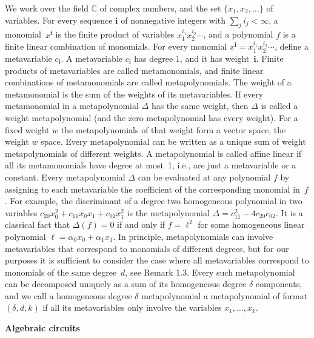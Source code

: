 We work over the field $\mathbb{C}$ of complex numbers, and the set $\{x_{1},x_{2},\ldots\}$ of variables.
For every sequence $\bm{i}$ of nonnegative integers with $\sum_{j}i_{j}<\infty$,
a monomial $x^{\bm{i}}$ is the finite product of variables $x_{1}^{i_{1}}x_{2}^{i_{2}}\cdots$, and a polynomial $f$ is a finite linear combination of monomials.
For every monomial $x^{\bm{i}}=x_{1}^{i_{1}}x_{2}^{i_{2}}\cdots$, define a metavariable $c_{\bm{i}}$.
A metavariable $c_{{\bm{i}}}$ has degree 1, and it has weight $\bm{i}$.
Finite products of metavariables are called metamonomials, and finite linear combinations of metamonomials are called metapolynomials.
The weight of a metamonomial is the sum of the weights of its metavariables.
If every metamonomial in a metapolynomial $\Delta$ has the same weight, then $\Delta$ is called a weight metapolynomial (and the zero metapolynomial has every weight).
For a fixed weight $w$ the metapolynomials of that weight form a vector space, the weight $w$ space.
Every metapolynomial can be written as a unique sum of weight metapolynomials of different weights.
A metapolynomial is called affine linear if all its metamonomials have degree at most 1, i.e., are just a metavariable or a constant.
Every metapolynomial $\Delta$ can be evaluated at any polynomial $f$ by assigning to each metavariable the coefficient of the corresponding monomial in $f$.
For example, the discriminant of a degree two homogeneous polynomial in two variables $c_{20}x_{0}^{2}+c_{11}x_{0}x_{1}+c_{02}x_{1}^{2}$ is the metapolynomial $\Delta=c_{11}^{2}-4c_{20}c_{02}$. It is a classical fact that $\Delta(f)=0$ if and only if $f=\ell^{2}$ for some homogeneous linear polynomial $\ell=\alpha_{0}x_{0}+\alpha_{1}x_{1}$.
In principle, metapolynomials can involve metavariables that correspond to monomials of different degrees, but for our purposes it is sufficient to consider the case where all metavariables correspond to monomials of the same degree $d$, see Remark 1.3.
Every such metapolynomial can be decomposed uniquely as a sum of its homogeneous degree $\delta$ components,
and we call a homogeneous degree $\delta$ metapolynomial a metapolynomial of format $(\delta,d,k)$ if all its metavariables only involve the variables $x_{1},\ldots,x_{k}$.






\par\medskip\noindent\textbf{Algebraic circuits}\par




